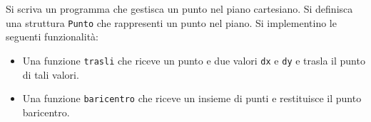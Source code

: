 \begin{Exercise}[label={ex:punto}]
    Si scriva un programma che gestisca un punto nel piano cartesiano.
    Si definisca una struttura \texttt{Punto} che rappresenti un punto nel piano.
    Si implementino le seguenti funzionalità:
    \begin{itemize}
        \item Una funzione \texttt{trasli} che riceve un punto e due valori \texttt{dx} e \texttt{dy} e trasla il punto di tali valori.
        \item Una funzione \texttt{baricentro} che riceve un insieme di punti e restituisce il punto baricentro.
    \end{itemize}
\end{Exercise}

\begin{Answer}[ref={ex:punto}]
  	
\end{Answer}